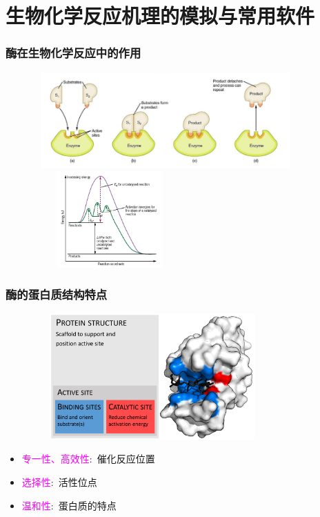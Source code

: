 \section{生物化学反应机理的模拟与常用软件}
\frame
{
	\frametitle{酶在生物化学反应中的作用}
\begin{figure}[h!]
\centering
\vspace{-5.5pt}
\includegraphics[height=1.45in,width=4.00in,viewport=0 0 800 310,clip]{Figures/enzyme-substrate-2.jpeg}
\includegraphics[height=1.45in,width=2.30in,viewport=0 0 850 780,clip]{Figures/Reaction-with-catalyst.jpg}
\label{Bio-Chem-enzy}
\end{figure}
}

\frame
{
	\frametitle{酶的蛋白质结构特点}
\begin{figure}[h!]
\centering
\vspace{-10.5pt}
\includegraphics[height=1.90in,width=3.60in,viewport=0 0 1950 1200,clip]{Figures/Enzyme_structure.png}
\label{enzyem_Structure}
\end{figure}
\begin{itemize}
	\item \textcolor{magenta}{专一性、高效性}:~催化反应位置
	\item \textcolor{magenta}{选择性}:~活性位点
	\item \textcolor{magenta}{温和性}:~蛋白质的特点
\end{itemize}
}

